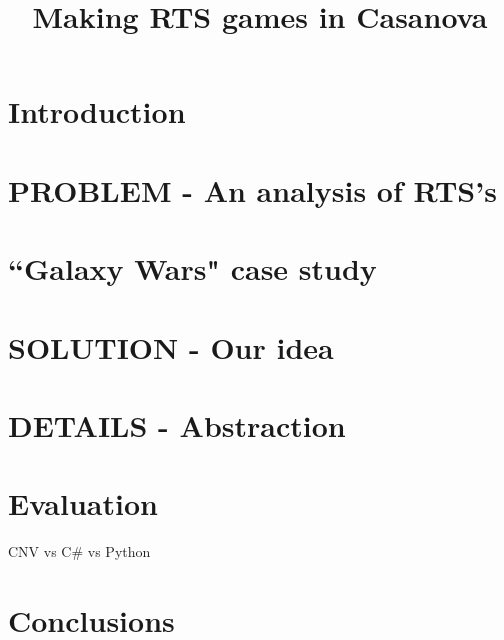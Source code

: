 \documentclass[10pt,a4paper]{article}
\author{}
\date{}
\title{Making RTS games in Casanova}
\begin{document}
\maketitle
\section{Introduction}


\section{PROBLEM - An analysis of RTS's}



\section{``Galaxy Wars" case study}




\section{SOLUTION - Our idea}




\section{DETAILS - Abstraction}


\section{Evaluation}
CNV vs C\# vs Python\\

\section{Conclusions}




\end{document}

